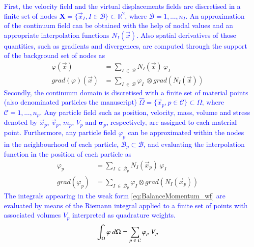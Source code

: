 \documentclass[preprint,12pt,a4paper]{elsarticle}
\newcommand{\tens}[1]{
  \ensuremath{\mathbf{{#1}}}
}
\newcommand\Grad[1]{grad({#1})}
\newcommand{\Integral}[2]{
  \IfStrEqCase{#1}{
    {2}{\ensuremath{\int_{\Gamma_d}{#2}\ d\Gamma}}
    {3}{\ensuremath{\int_{\Omega}{#2}\ d\Omega}}
  }
}
\begin{document}
\textcolor{blue}{First, the velocity field and the virtual displacements fields are discretised in a finite set of nodes $\textbf{X} = \{ \vec{x}_I, I \in \mathcal{B} \} \subset \mathbb{R}^{2}$, where $\mathcal{B} = 1, \ldots, n_I$. An approximation of the continuum field can be obtained with the help of nodal values and an appropriate interpolation functions $N_I(\vec{x})$. Also spatial derivatives of those quantities, such as gradients and divergences, are computed through the support of the background set of nodes as}
\begin{align}
    \label{eq:variable_reconstruction}
    \varphi(\vec{x}) &= \sum_{I\ \in\ \mathcal{B}} N_I(\vec{x})\ \varphi_I \\
    \label{eq:grad_variable_reconstruction}
    \Grad{\varphi}(\vec{x}) &= \sum_{I\ \in\ \mathcal{B}} \varphi_I\ \otimes \Grad{N_I(\vec{x})}
\end{align}
\textcolor{blue}{Secondly, the continuum \gls{domain} is discretised with a finite set of material points (also denominated particles the manuscript) $\hat{\Omega} = \{ \vec{x}_p, p \in \mathcal{C} \} \subset \Omega$, where $\mathcal{C} = 1, \ldots, n_p$. Any particle field such as position, velocity, mass, volume and stress denoted by $\vec{x}_p$, $\vec{v}_p$, $m_p$, $V_p$ and $\tens{\sigma}_p$, respectively, are assigned to each material point. Furthermore, any particle field $\varphi_p$ can be approximated within the nodes in the neighbourhood of each particle, $\mathcal{B}_p \subset \mathcal{B}$, and evaluating the interpolation function in the position of each particle as}
\begin{align}
    \label{eq:particle_variable_reconstruction}
\varphi_p &= \sum_{I\ \in\ \mathcal{B}_p} N_I(\vec{x}_p)\ \varphi_I \\
\Grad{\varphi_p} &= \sum_{I\ \in\ \mathcal{B}_p} \varphi_I \otimes \Grad{N_I(\vec{x}_p)}
\end{align}
\textcolor{blue}{The integrals appearing in the weak form \eqref{eq:BalanceMomentum_wf} are evaluated by means of the Riemann integral \cite{Riemann_1854} applied to a finite set of points with associated volumes $V_p$ interpreted as quadrature weights.}
\begin{equation}
    \label{eq:particle_riemann_integral}
\Integral{3}{\varphi} = \sum_{p\ \in\ \mathcal{C}} \varphi_p\ V_p 
\end{equation}
\end{document}
